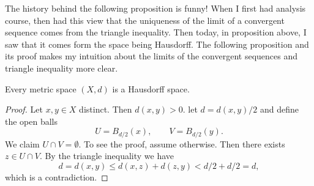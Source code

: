The history behind the following proposition is funny! When I first had analysis course, then had this view that the uniqueness of the limit of a convergent sequence comes from the triangle inequality. Then today, in proposition above, I saw that it comes form the space being Hausdorff. The following proposition and its proof makes my intuition about the limits of the convergent sequences and triangle inequality more clear. 

\begin{proposition}
	Every metric space $ (X,d) $ is a Hausdorff space.
\end{proposition}
\begin{proof}
	Let $ x,y \in X $ distinct. Then $ d(x,y) > 0  $. let $ d = d(x,y)/2 $ and define the open balls
	\[ U = B_{d/2}(x), \qquad V = B_{d/2}(y). \]
	We claim $ U\cap V = \emptyset $. To see the proof, assume otherwise. Then there exists $ z \in U \cap V $. By the triangle inequality we have
	\[ d = d(x,y) \leq d(x,z) + d(z,y) < d/2 + d/2 = d, \]
	which is a contradiction.
\end{proof}

